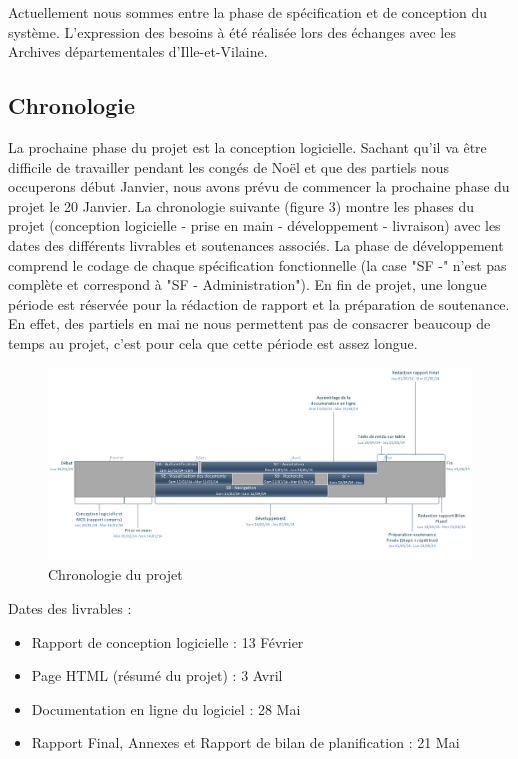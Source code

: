\documentclass[a4paper]{article}
\begin{document}
	Actuellement nous sommes entre la phase de spécification et de conception du système. L'expression des besoins à été réalisée lors des échanges avec les Archives départementales d’Ille-et-Vilaine.
	
\subsection{Chronologie}

	La prochaine phase du projet est la conception logicielle. Sachant qu'il va être difficile de travailler pendant les congés de Noël et que des partiels nous occuperons début Janvier, nous avons prévu de commencer la prochaine phase du projet le 20 Janvier. La chronologie suivante (figure 3) montre les phases du projet (conception logicielle - prise en main - développement - livraison) avec les dates des différents livrables et soutenances associés. La phase de développement comprend le codage de chaque spécification fonctionnelle (la case "SF -" n'est pas complète et correspond à "SF - Administration"). En fin de projet, une longue période est réservée pour la rédaction de rapport et la préparation de soutenance. En effet, des partiels en mai ne nous permettent pas de consacrer beaucoup de temps au projet, c'est pour cela que cette période est assez longue.
	
\begin{figure}[H]
\centering
\includegraphics[width=\textwidth]{chronologie.png}
\caption{Chronologie du projet}
\label{fig:chronologie}
\end{figure}

	Dates des livrables :

\begin{itemize}
\item Rapport de conception logicielle : 13 Février
\item Page HTML (résumé du projet) : 3 Avril
\item Documentation en ligne du logiciel : 28 Mai
\item Rapport Final, Annexes et Rapport de bilan de planification : 21 Mai
\end{itemize}
\end{document}
